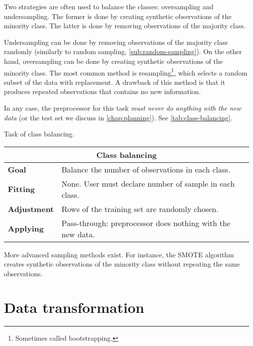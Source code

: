 Two strategies are often used to balance the classes: oversampling and undersampling.  The
former is done by creating synthetic observations of the minority class.  The latter is
done by removing observations of the majority class.

Undersampling can be done by removing observations of the majority class randomly
(similarly to random sampling, \cref{sub:random-sampling}).  On the other hand,
oversampling can be done by creating synthetic observations of the minority class.  The
most common method is resampling\footnote{Sometimes called bootstrapping.}, which selects
a random subset of the data with replacement.  A drawback of this method is that it
produces repeated observations that contains no new information.

In any case, the preprocessor for this task \emph{must never do anything with the new
data} (or the test set we discuss in \cref{chap:planning}).  See
\cref{tab:class-balancing}.

\begin{tablebox}[label=tab:class-balancing]{Task of class balancing.}
  \centering
  \begin{tabular}{lp{6cm}}
    \toprule
    \multicolumn{2}{c}{\textbf{Class balancing}} \\
    \midrule
    \textbf{Goal} &
      Balance the number of observations in each class. \\
    \textbf{Fitting} &
      None. User must declare number of sample in each class. \\
    \textbf{Adjustment} &
      Rows of the training set are randomly chosen. \\
    \textbf{Applying} &
      Pass-through: preprocessor does nothing with the new data. \\
    \bottomrule
  \end{tabular}
\end{tablebox}

More advanced sampling methods exist.  For instance, the SMOTE
algorithm creates synthetic observations of the minority
class without repeating the same observations.

\section{Data transformation}

